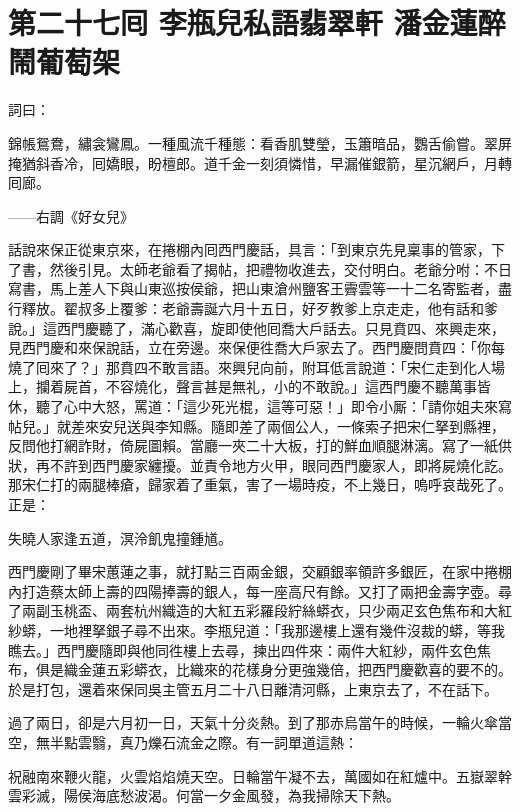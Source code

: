 
\chapter*{第二十七囘 李瓶兒私語翡翠軒 潘金蓮醉鬧葡萄架}


詞曰：

錦帳鴛鴦，繡衾鸞鳳。一種風流千種態：看香肌雙瑩，玉簫暗品，鸚舌偷嘗。翠屏掩猶斜香冷，囘嬌眼，盼檀郎。道千金一刻須憐惜，早漏催銀箭，星沉網戶，月轉囘廊。

——右調《好女兒》

話說來保正從東京來，在捲棚內囘西門慶話，具言：「到東京先見稟事的管家，下了書，然後引見。太師老爺看了揭帖，把禮物收進去，交付明白。老爺分咐：不日寫書，馬上差人下與山東巡按侯爺，把山東滄州鹽客王霽雲等一十二名寄監者，盡行釋放。翟叔多上覆爹：老爺壽誕六月十五日，好歹教爹上京走走，他有話和爹說。」這西門慶聽了，滿心歡喜，旋即使他囘喬大戶話去。只見賁四、來興走來，見西門慶和來保說話，立在旁邊。來保便徃喬大戶家去了。西門慶問賁四：「你每燒了囘來了？」那賁四不敢言語。來興兒向前，附耳低言說道：「宋仁走到化人場上，攔着屍首，不容燒化，聲言甚是無礼，小的不敢說。」這西門慶不聽萬事皆休，聽了心中大怒，罵道：「這少死光棍，這等可惡！」即令小厮：「請你姐夫來寫帖兒。」就差來安兒送與李知縣。隨即差了兩個公人，一條索子把宋仁拏到縣裡，反問他打網詐財，倚屍圖賴。{}當廳一夾二十大板，打的鮮血順腿淋漓。寫了一紙供狀，再不許到西門慶家纏擾。並責令地方火甲，眼同西門慶家人，即將屍燒化訖。那宋仁打的兩腿棒瘡，歸家着了重氣，害了一場時疫，不上幾日，嗚呼哀哉死了。正是：

失曉人家逢五道，溟泠飢鬼撞鍾馗。

西門慶剛了畢宋蕙蓮之事，就打點三百兩金銀，交顧銀率領許多銀匠，在家中捲棚內打造蔡太師上壽的四陽捧壽的銀人，每一座高尺有餘。又打了兩把金壽字壺。尋了兩副玉桃盃、兩套杭州織造的大紅五彩羅段紵絲蟒衣，只少兩疋玄色焦布和大紅紗蟒，一地裡拏銀子尋不出來。李瓶兒道：「我那邊樓上還有幾件沒裁的蟒，等我瞧去。」{}西門慶隨即與他同徃樓上去尋，揀出四件來：兩件大紅紗，兩件玄色焦布，俱是織金蓮五彩蟒衣，比織來的花樣身分更強幾倍，把西門慶歡喜的要不的。於是打包，還着來保同吳主管五月二十八日離清河縣，上東京去了，不在話下。

過了兩日，卻是六月初一日，天氣十分炎熱。到了那赤烏當午的時候，一輪火傘當空，無半點雲翳，真乃爍石流金之際。有一詞單道這熱：

祝融南來鞭火龍，火雲焰焰燒天空。日輪當午凝不去，萬國如在紅爐中。五嶽翠幹雲彩滅，陽侯海底愁波渴。何當一夕金風發，為我掃除天下熱。

